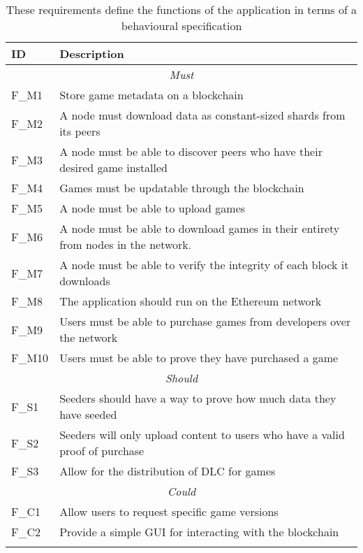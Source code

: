 \begin{longtable}{ p{} p{} }
  \toprule
  \textbf{ID} & \textbf{Description}
  \\\midrule\midrule
  \multicolumn{2}{c}{\cellcolor{red!70}\textit{Must}}                                              \\\midrule
  F\_M1       & Store game metadata on a blockchain                                                \\
  F\_M2       & A node must download data as constant-sized shards from its peers                  \\
  F\_M3       & A node must be able to discover peers who have their desired game installed        \\
  F\_M4       & Games must be updatable through the blockchain                                     \\
  F\_M5       & A node must be able to upload games                                                \\
  F\_M6       & A node must be able to download games in their entirety from nodes in the network. \\
  F\_M7       & A node must be able to verify the integrity of each block it downloads             \\
  F\_M8       & The application should run on the Ethereum network                                 \\
  F\_M9       & Users must be able to purchase games from developers over the network              \\
  F\_M10      & Users must be able to prove they have purchased a game                             \\
  \midrule\multicolumn{2}{c}{\cellcolor{orange!70}\textit{Should}}                                 \\\midrule
  F\_S1       & Seeders should have a way to prove how much data they have seeded                  \\
  F\_S2       & Seeders will only upload content to users who have a valid proof of purchase       \\
  F\_S3       & Allow for the distribution of DLC for games                                        \\
  \midrule\multicolumn{2}{c}{\cellcolor{green}\textit{Could}}                                      \\\midrule
  F\_C1       & Allow users to request specific game versions                                      \\
  F\_C2       & Provide a simple GUI for interacting with the blockchain                           \\
  \midrule
  \bottomrule
  \caption{These requirements define the functions of the application in terms of a behavioural specification }
  \label{tab:functional-requirements}
\end{longtable}

